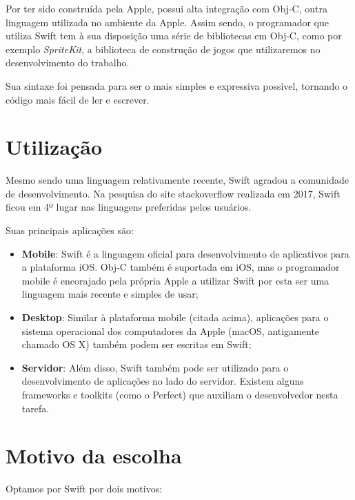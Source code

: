 \documentclass[rel_mlp]{iiufrgs}
\begin{document}
Por ter sido construída pela Apple, possui alta integração com Obj-C, outra linguagem utilizada no ambiente da Apple. Assim sendo, o programador que utiliza Swift tem à sua disposição uma série de bibliotecas em Obj-C, como por exemplo \textit{SpriteKit}, a biblioteca de construção de jogos que utilizaremos no desenvolvimento do trabalho.

Sua sintaxe foi pensada para ser o mais simples e expressiva possível, tornando o código mais fácil de ler e escrever.


\section{Utilização}

Mesmo sendo uma linguagem relativamente recente, Swift agradou a comunidade de desenvolvimento. Na pesquisa do site stackoverflow realizada em 2017, Swift ficou em 4º lugar nas linguagens preferidas pelos usuários.

Suas principais aplicações são:

\begin{itemize}[leftmargin=3em] %
\setlength{\itemindent}{1em}

    \item \textbf{Mobile}: Swift é a linguagem oficial para desenvolvimento de aplicativos para a plataforma iOS. Obj-C também é suportada em iOS, mas o programador mobile é encorajado pela própria Apple a utilizar Swift por esta ser uma linguagem mais recente e simples de usar;

    \item \textbf{Desktop}: Similar à plataforma mobile (citada acima), aplicações para o sistema operacional dos computadores da Apple (macOS, antigamente chamado OS X) também podem ser escritas em Swift;

    \item \textbf{Servidor}: Além disso, Swift também pode ser utilizado para o desenvolvimento de aplicações no lado do servidor. Existem alguns frameworks e toolkits (como o Perfect) que auxiliam o desenvolvedor nesta tarefa.

\end{itemize}

\section{Motivo da escolha}

Optamos por Swift por dois motivos:
\end{document}
